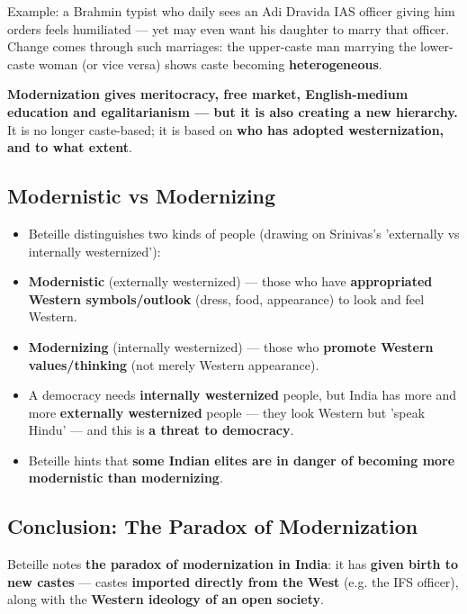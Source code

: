 \begin{ExampleBox}
Example: a Brahmin typist who daily sees an Adi Dravida IAS officer giving him orders feels humiliated --- yet may even want his daughter to marry that officer. Change comes through such marriages: the upper-caste man marrying the lower-caste woman (or vice versa) shows caste becoming \textbf{heterogeneous}.
\end{ExampleBox}

\begin{CriticalPoint}
\textbf{Modernization gives meritocracy, free market, English-medium education and egalitarianism --- but it is also creating a new hierarchy.} It is no longer caste-based; it is based on \textbf{who has adopted westernization, and to what extent}.
\end{CriticalPoint}

\subsection{Modernistic vs Modernizing}

\begin{KeyConcept}
\begin{itemize}
\item Beteille distinguishes two kinds of people (drawing on Srinivas's 'externally vs internally westernized'):
\item \textbf{Modernistic} (externally westernized) --- those who have \textbf{appropriated Western symbols/outlook} (dress, food, appearance) to look and feel Western.
\item \textbf{Modernizing} (internally westernized) --- those who \textbf{promote Western values/thinking} (not merely Western appearance).
\item A democracy needs \textbf{internally westernized} people, but India has more and more \textbf{externally westernized} people --- they look Western but 'speak Hindu' --- and this is \textbf{a threat to democracy}.
\item Beteille hints that \textbf{some Indian elites are in danger of becoming more modernistic than modernizing}.
\end{itemize}
\end{KeyConcept}

\subsection{Conclusion: The Paradox of Modernization}

\begin{KeyConcept}
Beteille notes \textbf{the paradox of modernization in India}: it has \textbf{given birth to new castes} --- castes \textbf{imported directly from the West} (e.g. the IFS officer), along with the \textbf{Western ideology of an open society}.
\end{KeyConcept}


